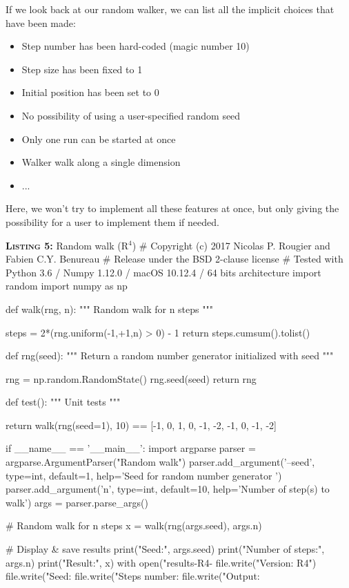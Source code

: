 \documentclass[a4paper,11pt]{article}
\begin{document}
If we look back at our random walker, we can list all the implicit choices that have been made:
\begin{itemize}
\item Step number has been hard-coded (magic number 10)
\item Step size has been fixed to 1
\item Initial position has been set to 0
\item No possibility of using a user-specified random seed
\item Only one run can be started at once
\item Walker walk along a single dimension
\item ...
\end{itemize}
Here, we won't try to implement all these features at once, but only giving the possibility for a user to implement them if needed.\\

\noindent \begin{minipage}[c]{\linewidth}
\begin{code}{\textbf{\textsc{Listing 5:}} Random walk (R$^4$)}
# Copyright (c) 2017 Nicolas P. Rougier and Fabien C.Y. Benureau
# Release under the BSD 2-clause license
# Tested with Python 3.6 / Numpy 1.12.0 / macOS 10.12.4 / 64 bits architecture
import random
import numpy as np

def walk(rng, n):
    """ Random walk for n steps """

    steps = 2*(rng.uniform(-1,+1,n) > 0) - 1
    return steps.cumsum().tolist()

def rng(seed):
    """ Return a random number generator initialized with seed """ 
    
    rng = np.random.RandomState()
    rng.seed(seed)
    return rng

def test():
    """ Unit tests """

    return walk(rng(seed=1), 10) == [-1, 0, 1, 0, -1, -2, -1, 0, -1, -2]

if __name__ == '__main__':
    import argparse
    parser = argparse.ArgumentParser("Random walk")
    parser.add_argument('--seed', type=int, default=1,
                        help='Seed for random number generator ')
    parser.add_argument('n', type=int, default=10,
                        help='Number of step(s) to walk')
    args = parser.parse_args()

    # Random walk for n steps
    x = walk(rng(args.seed), args.n)

    # Display & save results
    print("Seed:", args.seed)
    print("Number of steps:", args.n)
    print("Result:",  x)
    with open("results-R4-%
        file.write("Version: R4")
        file.write("Seed: %
        file.write("Steps number: %
        file.write("Output: %
\end{code}
\end{minipage}\\
\end{document}

